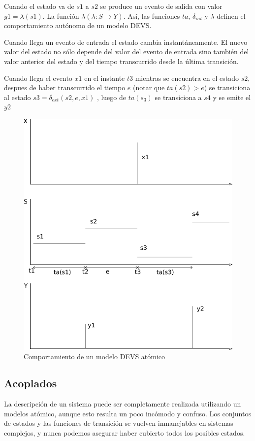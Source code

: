 	Cuando el estado va de $s1$ a $s2$ se produce un evento de salida con valor $y1 = \lambda(s1)$. La función $\lambda (\lambda : S \to Y )$.
	 Así, las funciones $ta$, $\delta_{int}$ y $\lambda$ definen el comportamiento autónomo de un modelo DEVS.

	Cuando llega un evento de entrada  el estado cambia instantáneamente. El nuevo valor del estado no sólo depende del valor del evento de entrada sino 
	también del valor anterior del estado y del tiempo transcurrido desde la última transición.

	Cuando llega el evento $x1$ en el instante $t3$ mientras se encuentra en el estado $s2$, despues de haber transcurrido el tiempo $e$ 
	(notar que $ta(s2 ) > e$) se transiciona al estado $s3 = \delta_{ext} (s2 , e, x1 )$ , luego de $ta(s_3)$ se transiciona a $s4$ y se emite el $y2$

	\begin{figure}[H]
	\centering
	  \includegraphics[scale=0.45]{devs-atomic}
	  \caption{Comportamiento de un modelo DEVS atómico}
	   \label{fig:fig2-5}
	\end{figure}


	\subsection{Acoplados}
	La descripción de un sistema puede ser completamente realizada utilizando un modelos atómico, aunque esto resulta un poco incómodo y confuso. 
	Los conjuntos de estados y las funciones de transición se vuelven inmanejables en sistemas complejos, y nunca podemos asegurar haber cubierto todos 
	los posibles estados.

